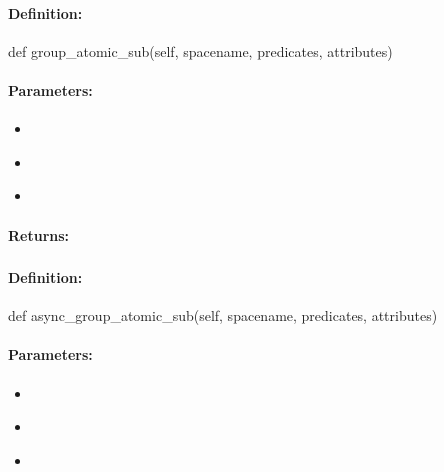 \paragraph{Definition:}
\begin{pythoncode}
def group_atomic_sub(self, spacename, predicates, attributes)
\end{pythoncode}

\paragraph{Parameters:}
\begin{itemize}[noitemsep]
\item {}\\

\item {}\\

\item {}\\

\end{itemize}

\paragraph{Returns:}


\pagebreak
\subsubsection{}
\label{api:python:async_group_atomic_sub}


\paragraph{Definition:}
\begin{pythoncode}
def async_group_atomic_sub(self, spacename, predicates, attributes)
\end{pythoncode}

\paragraph{Parameters:}
\begin{itemize}[noitemsep]
\item {}\\

\item {}\\

\item {}\\

\end{itemize}

